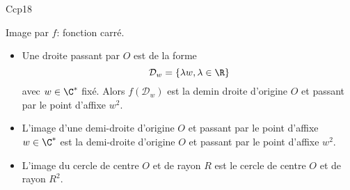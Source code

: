 \begin{tiny} Ccp18 \end{tiny} Image par $f$: fonction \og carré\fg.
\begin{itemize}
 \item Une droite passant par $O$ est de la forme
\[
 \mathcal{D}_w = \left\lbrace \lambda w, \lambda \in \R\right\rbrace 
\]
avec $w\in \C^*$ fixé. Alors $f(\mathcal{D}_w)$ est la demin droite d'origine $O$ et passant par le point d'affixe $w^2$.
 \item L'image d'une demi-droite d'origine $O$ et passant par le point d'affixe $w\in \C^*$ est la demi-droite d'origine $O$ et passant par le point d'affixe $w^2$.
 \item L'image du cercle de centre $O$ et de rayon $R$ est le cercle de centre $O$ et de rayon $R^2$. 
\end{itemize}
